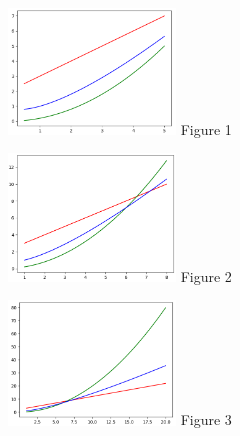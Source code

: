\documentclass[12pt,a4paper]{report}
\begin{document}
\clearpage

\parbox{0.333333333\textwidth}{\centering
	\includegraphics[width=0.33333333333\textwidth]{smallgraph}
	Figure 1}
\parbox{0.333333333\textwidth}{\centering
	\includegraphics[width=0.33333333333\textwidth]{mediumgraph}
	Figure 2}
\parbox{0.333333333\textwidth}{\centering
	\includegraphics[width=0.33333333333\textwidth]{largegraph}
	Figure 3}\\
\end{document}
